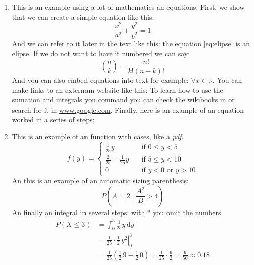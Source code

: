 \begin{enumerate}
 \item 
 This is an example using a lot of mathematics an equations. 
 First, we show that we can create a simple equation like this:
 \begin{equation}
 \label{eq:elipse}
 \frac{x^{2}}{a^{2}} + \frac{y^{2}}{b^{2}} = 1
 \end{equation}
 And we can refer to it later in the text like this: the equation \eqref{eq:elipse} is an elipse. If we do not want to have it numbered we can say:
 \begin{equation}
 \nonumber
 \binom{n}{k} = \frac{n!}{k!(n-k)!} 
 \end{equation}
 And you can also embed equations into text for example: $\forall x \in \mathbb{R}$. 
 You can make links to an externam website like this: 
 To learn how to use the sumation and integrals you command you can check the \href{https://en.wikibooks.org/wiki/LaTeX/Mathematics#Sums_and_integrals}{wikibooks} 
 in or search for it in \url{www.google.com}. Finally, here is an example of an equation worked in a series of steps:
 
 \item This is an example of an function with cases, like a \emph{pdf}.
 \begin{equation}
  \label{eq:pdf}
  f(y) =
  \begin{cases}
    \frac{1}{25} y & \quad \text{if } 0 \leq y < 5 \\
    \frac{2}{25} - \frac{1}{25} y & \quad \text{if } 5 \leq y < 10 \\
    0 & \quad \text{if } y < 0 \text{ or } y > 10
  \end{cases}
 \end{equation}
 An this is an example of an automatic sizing parenthesis:
 \begin{equation}
  \nonumber
  P\left(A=2\middle|\frac{A^2}{B}>4\right)
 \end{equation}
 An finally an integral in several steps: with $*$ you omit the numbers
\begin{align*}
P\left(X \leq 3 \right) &= \int_{0}^{3} \frac{1}{25} y \,\mathrm{d}y \\
     &= \left. \frac{1}{25} \cdot \frac{1}{2} \, y^{2} \right|_0^3 \\
     &= \frac{1}{25} \left( \frac{1}{2} \, 9 - \frac{1}{2} \, 0 \right) =
     \frac{1}{25} \cdot \frac{9}{2} = \frac{9}{50} \approx 0.18 
\end{align*}


\end{enumerate}
